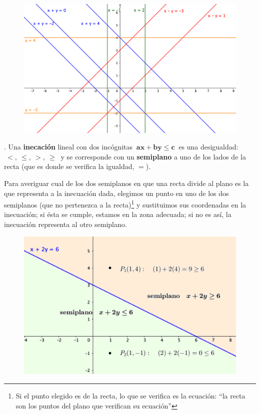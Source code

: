 \begin{figure}[H]
	\centering
	\includegraphics[width=.9\textwidth]{imagenes/img05.png}
\end{figure}

\vspace{5mm}
\begin{theorem}
.	Una \textbf{inecación} lineal con dos incógnitas $ \ \boldsymbol{ax+by \le c} \ $ es una desigualdad: $\ <,\ \le, \ >,\ \ge\ $ y se corresponde con un \textbf{semiplano} a uno de los lados de la recta (que es donde se verifica la igualdad, $=$).

\vspace{5mm}
\begin{destacado}
	Para averiguar cual de los dos semiplanos en que una recta divide al plano es la que representa a la inecuación dada, elegimos un punto en uno de los dos semiplanos (que no pertenezca a la recta)\footnote{Si el punto elegido es de la recta, lo que se verifica es la ecuación: ``la recta son los puntos del plano que verifican su ecuación''} y sustituimos sus coordenadas en la inecuación; si ésta se cumple, estamos en la zona adecuada; si no es así, la inecuación representa al otro semiplano.
\end{destacado}
\end{theorem}

\begin{figure}[H]
	\centering
	\includegraphics[width=.75\textwidth]{imagenes/img06.png}
\end{figure}

